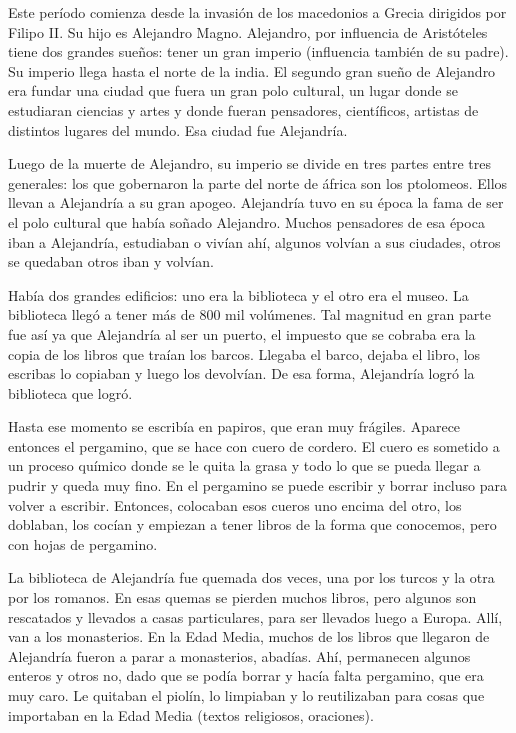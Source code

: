 Este período comienza desde la invasión de los macedonios a Grecia dirigidos por Filipo II. Su hijo es Alejandro Magno. Alejandro, por influencia de Aristóteles tiene dos grandes sueños: tener un gran imperio (influencia también de su padre). Su imperio llega hasta el norte de la india. El segundo gran sueño de Alejandro era fundar una ciudad que fuera un gran polo cultural, un lugar donde se estudiaran ciencias y artes y donde fueran pensadores, científicos, artistas de distintos lugares del mundo. Esa ciudad fue Alejandría.

Luego de la muerte de Alejandro, su imperio se divide en tres partes entre tres generales: los que gobernaron la parte del norte de áfrica son los ptolomeos. Ellos llevan a Alejandría a su gran apogeo. Alejandría tuvo en su época la fama de ser el polo cultural que había soñado Alejandro. Muchos pensadores de esa época iban a Alejandría, estudiaban o vivían ahí, algunos volvían a sus ciudades, otros se quedaban otros iban y volvían. 

Había dos grandes edificios: uno era la biblioteca y el otro era el museo. La biblioteca llegó a tener más de 800 mil volúmenes. Tal magnitud en gran parte fue así ya que Alejandría al ser un puerto, el impuesto que se cobraba era la copia de los libros que traían los barcos. Llegaba el barco, dejaba el libro, los escribas lo copiaban y luego los devolvían. De esa forma, Alejandría logró la biblioteca que logró. 

Hasta ese momento se escribía en papiros, que eran muy frágiles. Aparece entonces el pergamino, que se hace con cuero de cordero. El cuero es sometido a un proceso químico donde se le quita la grasa y todo lo que se pueda llegar a pudrir y queda muy fino. En el pergamino se puede escribir y borrar incluso para volver a escribir. Entonces, colocaban esos cueros uno encima del otro, los doblaban, los cocían y empiezan a tener libros de la forma que conocemos, pero con hojas de pergamino.

La biblioteca de Alejandría fue quemada dos veces, una por los turcos y la otra por los romanos. En esas quemas se pierden muchos libros, pero algunos son rescatados y llevados a casas particulares, para ser llevados luego a Europa. Allí, van a los monasterios. En la Edad Media, muchos de los libros que llegaron de Alejandría fueron a parar a monasterios, abadías. Ahí, permanecen algunos enteros y otros no, dado que se podía borrar y hacía falta pergamino, que era muy caro. Le quitaban el piolín, lo limpiaban y lo reutilizaban para cosas que importaban en la Edad Media (textos religiosos, oraciones).

